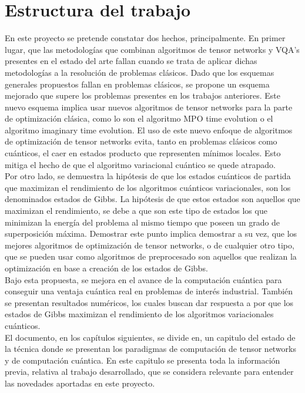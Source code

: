 \newpage

\section{Estructura del trabajo}

En este proyecto se pretende constatar dos hechos, principalmente. En primer lugar, que las metodologías que combinan algoritmos de tensor networks y VQA's presentes en el estado del arte fallan cuando se trata de aplicar dichas metodologías a la resolución de problemas clásicos. Dado que los esquemas generales propuestos fallan en problemas clásicos, se propone un esquema mejorado que supere los problemas presentes en los trabajos anteriores. Este nuevo esquema implica usar nuevos algoritmos de tensor networks para la parte de optimización clásica, como lo son el algoritmo MPO time evolution o el algoritmo imaginary time evolution. El uso de este nuevo enfoque de algoritmos de optimización de tensor networks evita, tanto en problemas clásicos como cuánticos, el caer en estados producto que representen mínimos locales. Esto mitiga el hecho de que el algoritmo variacional cuántico se quede atrapado. \\

Por otro lado, se demuestra la hipótesis de que los estados cuánticos de partida que maximizan el rendimiento de los algoritmos cuánticos variacionales, son los denominados estados de Gibbs. La hipótesis de que estos estados son aquellos que maximizan el rendimiento, se debe a que son este tipo de estados los que minimizan la energía del problema al mismo tiempo que poseen un grado de superposición máxima. Demostrar este punto implica demostrar a su vez, que los mejores algoritmos de optimización de tensor networks, o de cualquier otro tipo, que se pueden usar como algoritmos de preprocesado son aquellos que realizan la optimización en base a creación de los estados de Gibbs. \\

Bajo esta propuesta, se mejora en el avance de la computación cuántica para conseguir una ventaja cuántica real en problemas de interés industrial. También se presentan resultados numéricos, los cuales buscan dar respuesta a por que los estados de Gibbs maximizan el rendimiento de los algoritmos variacionales cuánticos. \\

El documento, en los capítulos siguientes, se divide en, un capitulo del estado de la técnica donde se presentan los paradigmas de computación de tensor networks y de computación cuántica. En este capitulo se presenta toda la información previa, relativa al trabajo desarrollado, que se considera relevante para entender las novedades aportadas en este proyecto. 

